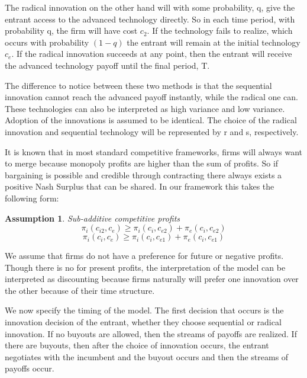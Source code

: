 \documentclass[11pt]{article}
\newtheorem{assumption}{Assumption}
\begin{document}

The radical innovation on the other hand will with some probability, q, give the entrant access to the advanced technology directly. So in each time period, with probability q, the firm will have cost $c_2$. If the technology fails to realize, which occurs with probability $(1-q)$ the entrant will remain at the initial technology $c_e$. If the radical innovation succeeds at any point, then the entrant will receive the advanced technology payoff until the final period, T. 


The difference to notice between these two methods is that the sequential innovation cannot reach the advanced payoff instantly, while the radical one can. These technologies can also be interpreted as high variance and low variance. Adoption of the innovations is assumed to be identical. 
The choice of the radical innovation and sequential technology will be represented by r and s, respectively.  


It is known that in most standard competitive frameworks, firms will always want to merge because monopoly profits are higher than the sum of profits. So if bargaining is possible and credible through contracting there always exists a positive Nash Surplus that can be shared. In our framework this takes the following form: 

\begin{assumption}{Sub-additive competitive profits}
\begin{equation*}
\pi_{i}(c_{i2},c_{e}) \geq  \pi_{i}(c_{i},c_{e2}) + \pi_{e}(c_{i},c_{e2})
\end{equation*}
\begin{equation*}
\pi_{i}(c_{i},c_{e}) \geq  \pi_{i}(c_{i},c_{e1}) + \pi_{e}(c_{i},c_{e1})
\end{equation*}
\end{assumption}


We assume that firms do not have a preference for future or negative profits. Though there is no  for present profits, the interpretation of the model can be interpreted as discounting because firms naturally will prefer one innovation over the other because of their time structure. 

We now specify the timing of the model. The first decision that occurs is the innovation decision of the entrant, whether they choose sequential or radical innovation. If no buyouts are allowed, then the streams of payoffs are realized. If there are buyouts, then after the choice of innovation occurs, the entrant negotiates with the incumbent and the buyout occurs and then the streams of payoffs occur. 
\end{document}

